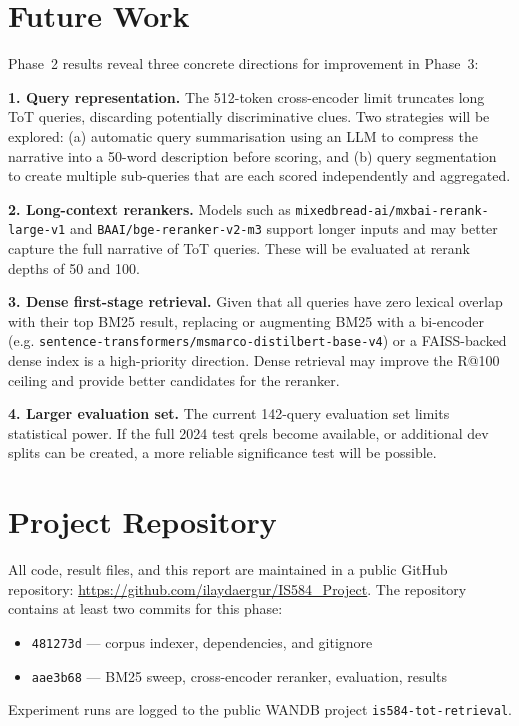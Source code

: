 \documentclass[conference]{IEEEtran}
\begin{document}
\section{Future Work}
\label{sec:future}

Phase~2 results reveal three concrete directions for improvement in Phase~3:

\textbf{1. Query representation.}
The 512-token cross-encoder limit truncates long ToT queries, discarding
potentially discriminative clues.
Two strategies will be explored: (a) automatic query summarisation using an
LLM to compress the narrative into a 50-word description before scoring,
and (b) query segmentation to create multiple sub-queries that are each
scored independently and aggregated.

\textbf{2. Long-context rerankers.}
Models such as \texttt{mixedbread-ai/mxbai-rerank-large-v1} and
\texttt{BAAI/bge-reranker-v2-m3} support longer inputs and may
better capture the full narrative of ToT queries.
These will be evaluated at rerank depths of 50 and 100.

\textbf{3. Dense first-stage retrieval.}
Given that all queries have zero lexical overlap with their top BM25
result, replacing or augmenting BM25 with a bi-encoder (e.g.
\texttt{sentence-transformers/msmarco-distilbert-base-v4}) or a
FAISS-backed dense index is a high-priority direction.
Dense retrieval may improve the R@100 ceiling and provide better
candidates for the reranker.

\textbf{4. Larger evaluation set.}
The current 142-query evaluation set limits statistical power.
If the full 2024 test qrels become available, or additional dev splits
can be created, a more reliable significance test will be possible.

\section{Project Repository}
\label{sec:repo}

All code, result files, and this report are maintained in a public GitHub
repository: \url{https://github.com/ilaydaergur/IS584_Project}.
The repository contains at least two commits for this phase:
\begin{itemize}
  \item \texttt{481273d} — corpus indexer, dependencies, and gitignore
  \item \texttt{aae3b68} — BM25 sweep, cross-encoder reranker, evaluation, results
\end{itemize}
Experiment runs are logged to the public WANDB project
\texttt{is584-tot-retrieval}.
\end{document}
